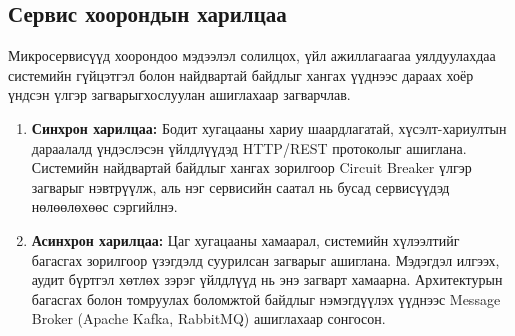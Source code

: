 
\subsection{Сервис хоорондын харилцаа}
Микросервисүүд хоорондоо мэдээлэл солилцох, үйл ажиллагаагаа уялдуулахдаа системийн гүйцэтгэл болон найдвартай байдлыг хангах үүднээс дараах хоёр үндсэн үлгэр загварыгхослуулан ашиглахаар загварчлав.

\begin{enumerate}
\item \textbf{Синхрон харилцаа:} Бодит хугацааны хариу шаардлагатай, хүсэлт-хариултын дараалалд үндэслэсэн үйлдлүүдэд HTTP/REST протоколыг ашиглана. Системийн найдвартай байдлыг хангах зорилгоор Circuit Breaker үлгэр загварыг нэвтрүүлж, аль нэг сервисийн саатал нь бусад сервисүүдэд нөлөөлөхөөс сэргийлнэ.

\item \textbf{Асинхрон харилцаа:} Цаг хугацааны хамаарал, системийн хүлээлтийг багасгах зорилгоор үзэгдэлд суурилсан загварыг ашиглана. Мэдэгдэл илгээх, аудит бүртгэл хөтлөх зэрэг үйлдлүүд нь энэ загварт хамаарна. Архитектурын багасгах болон томруулах боломжтой байдлыг нэмэгдүүлэх үүднээс Message Broker (Apache Kafka, RabbitMQ) ашиглахаар сонгосон.
\end{enumerate}

